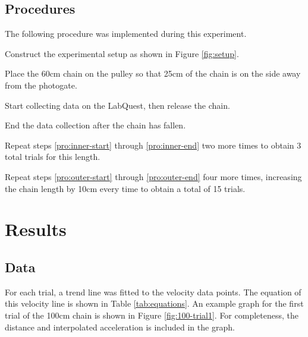 \documentclass[stu,biblatex,floatsintext,draftall]{apa7}
\begin{document}
\subsection{Procedures}
The following procedure was implemented during this experiment.
\begin{APAenumerate}
	\item Construct the experimental setup as shown in Figure \ref{fig:setup}.
	\item\label{pro:outer-start} Place the 60\unit{\centi\meter} chain on the pulley so that 25\unit{\centi\meter} of the chain is on the side away from the photogate.
	\item\label{pro:inner-start} Start collecting data on the LabQuest, then release the chain.
	\item\label{pro:inner-end} End the data collection after the chain has fallen.
	\item\label{pro:outer-end} Repeat steps \ref{pro:inner-start} through \ref{pro:inner-end} two more times to obtain 3 total trials for this length.
	\item Repeat steps \ref{pro:outer-start} through \ref{pro:outer-end} four more times, increasing the chain length by 10\unit{\centi\meter} every time to obtain a total of 15 trials.
\end{APAenumerate}

\section{Results}

\subsection{Data}
For each trial, a trend line was fitted to the velocity data points. The equation of this velocity line is shown in Table \ref{tab:equations}. An example graph for the first trial of the 100\unit{\centi\meter} chain is shown in Figure \ref{fig:100-trial1}. For completeness, the distance and interpolated acceleration is included in the graph.
\end{document}
